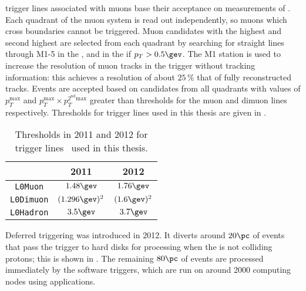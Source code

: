 \lone trigger lines associated with muons base their acceptance on measurements of \pt.
Each quadrant of the muon system is read out independently, so muons which cross boundaries cannot
be triggered.
Muon candidates with the highest and second highest \pt are selected from each quadrant by
searching for straight lines through M1-5 in the , and in the  if
$p_T>0.5\gev$.
The M1 station is used to increase the \pt resolution of muon tracks in the trigger without
tracking information: this achieves a resolution of about $25\,\%$ that of fully reconstructed
tracks.
Events are accepted based on candidates from all quadrants with values of $p_T^\mathrm{max}$ and
$p_T^\mathrm{max}\times p_T^\mathrm{2^{nd} max}$ greater than thresholds for the muon and dimuon
lines respectively.
Thresholds for \lone trigger lines used in this thesis are given in .

\begin{table}
  \caption[Level one trigger thresholds]
  {
    Thresholds in 2011 and 2012 for \lone trigger lines~\cite{Albrecht:2013fba} used in this thesis.
  }
  \label{tab:lhcb:trigger}
  \begin{center}
    \begin{tabular}{ccc}\toprule
      &2011&2012\\\midrule
      {\tt L0Muon} & $1.48\gev$ & $1.76\gev$ \\
      {\tt L0Dimuon} & $(1.296\gev)^2$ & $(1.6\gev)^2$ \\
      {\tt L0Hadron} & $3.5\gev$ & $3.7\gev$ \\
      \bottomrule
    \end{tabular}
  \end{center}
\end{table}

Deferred triggering was introduced in 2012.
It diverts around $20\pc$ of events that pass the \lone trigger to hard disks for processing when
the \lhc is not colliding protons; this is shown in .
The remaining $80\pc$ of events are processed immediately by the software triggers, which are
run on around 2000 computing nodes using \cpp applications.

